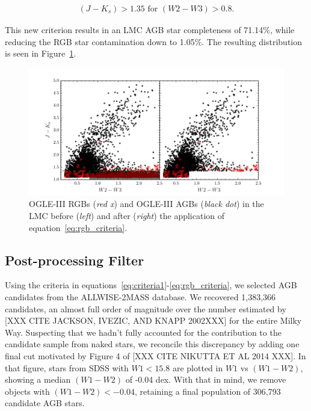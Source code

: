 \begin{align}
(J-K_s) > 1.35 \text{ for } (W2-W3) > 0.8.\label{eq:rgb_criteria}
\end{align}

\noindent This new criterion results in an LMC AGB star completeness of 71.14\%, while reducing the RGB star contamination down to 1.05\%. The resulting distribution is seen in Figure~\ref{fig:rgbs_after_cut}.


\begin{figure}[h]
\includegraphics[width=6.5in]{figs/remove_rgbs.pdf}
\caption{OGLE-III RGBs (\emph{red x}) and OGLE-III AGBs (\emph{black dot}) in the LMC before (\emph{left}) and after (\emph{right}) the application of equation~\ref{eq:rgb_criteria}. 
\label{fig:rgbs_after_cut}}
\end{figure}

\subsection{Post-processing Filter}
Using the criteria in equations~\ref{eq:criteria1}-\ref{eq:rgb_criteria}, we selected AGB candidates from the ALLWISE-2MASS database. We recovered 1,383,366 candidates, an almost full order of magnitude over the number estimated by [XXX CITE JACKSON, IVEZIC, AND KNAPP 2002XXX] for the entire Milky Way. Suspecting that we hadn't fully accounted for the contribution to the candidate sample from naked stars, we reconcile this discrepancy by adding one final cut motivated by Figure 4 of [XXX CITE NIKUTTA ET AL 2014 XXX]. In that figure, stars from SDSS with $W1 < 15.8$ are plotted in $W1$ vs $(W1-W2)$, showing a median $(W1-W2)$ of -0.04 dex. With that in mind, we remove objects with $(W1-W2) < -0.04$, retaining a final  population of 306,793 candidate AGB stars.





